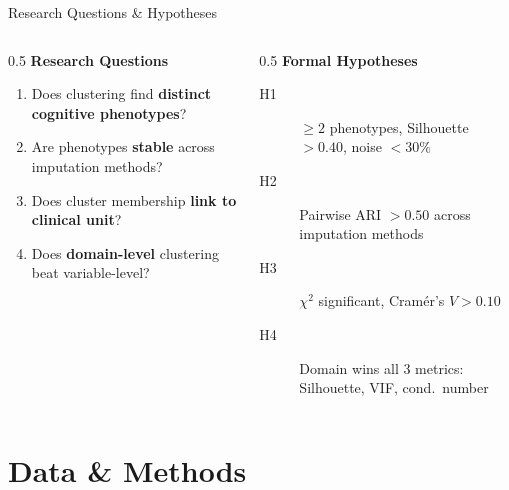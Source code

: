 \documentclass[aspectratio=169, 11pt]{beamer}
\begin{document}
\begin{frame}{Research Questions \& Hypotheses}
  \begin{columns}[T]
    \begin{column}{0.5\textwidth}
      \textbf{Research Questions}
      \begin{enumerate}
        \item Does clustering find \textbf{distinct cognitive phenotypes}?
        \item Are phenotypes \textbf{stable} across imputation methods?
        \item Does cluster membership \textbf{link to clinical unit}?
        \item Does \textbf{domain-level} clustering beat variable-level?
      \end{enumerate}
    \end{column}
    \begin{column}{0.5\textwidth}
      \textbf{Formal Hypotheses}
      \begin{description}
        \item[H1] $\geq 2$ phenotypes, Silhouette $> 0.40$, noise $< 30\%$
        \item[H2] Pairwise ARI $> 0.50$ across imputation methods
        \item[H3] $\chi^2$ significant, Cram\'er's $V > 0.10$
        \item[H4] Domain wins all 3 metrics: Silhouette, VIF, cond.\ number
      \end{description}
    \end{column}
  \end{columns}
\end{frame}

\section{Data \& Methods}
\end{document}
